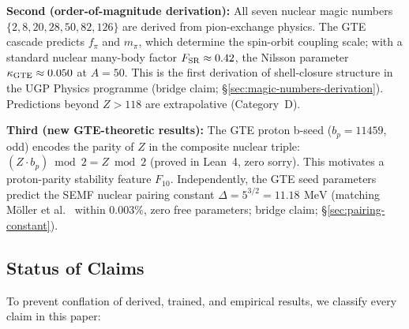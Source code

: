 \documentclass[9pt,twocolumn]{extarticle}
\newcommand{\mev}{\,\text{MeV}}
\begin{document}
\textbf{Second (order-of-magnitude derivation):} All seven nuclear magic numbers $\{2, 8, 20, 28, 50, 82, 126\}$ are derived from pion-exchange physics. The GTE cascade predicts $f_\pi$ and $m_\pi$, which determine the spin-orbit coupling scale; with a standard nuclear many-body factor $F_{\rm SR} \approx 0.42$, the Nilsson parameter $\kappa_{\rm GTE} \approx 0.050$ at $A = 50$. This is the first derivation of shell-closure structure in the UGP Physics programme (bridge claim; \S\ref{sec:magic-numbers-derivation}). Predictions beyond $Z>118$ are extrapolative (Category~D).

\textbf{Third (new GTE-theoretic results):} The GTE proton b-seed ($b_p=11459$, odd) encodes the parity of $Z$ in the composite nuclear triple: $(Z \cdot b_p)\bmod 2 = Z\bmod 2$ (proved in Lean~4, zero sorry). This motivates a proton-parity stability feature $F_{10}$. Independently, the GTE seed parameters predict the SEMF nuclear pairing constant $\Delta = 5^{3/2} = \SI{11.18}{\mev}$ (matching M\"{o}ller et al.~\cite{Moller1995} within $0.003\%$, zero free parameters; bridge claim; \S\ref{sec:pairing-constant}).


\subsection*{Status of Claims}
\label{sec:status-claims}

To prevent conflation of derived, trained, and empirical results, we classify every claim in this paper:
\end{document}
